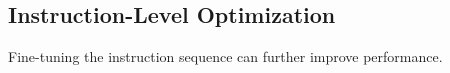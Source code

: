 \subsection{Instruction-Level Optimization}

Fine-tuning the instruction sequence can further improve performance.

